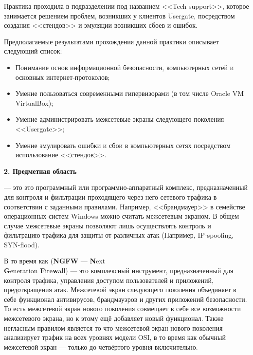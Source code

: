 Практика проходила в подразделении под названием <<Tech support>>, которое занимается решением проблем, возникших у клиентов Usergate, посредством создания <<стендов>> и эмуляции возникших сбоев и ошибок.
		
Предполагаемые результатами прохождения данной практики описывает следующий список:

\begin{itemize}[nosep]
	\item Понимание основ информационной безопасности, компьютерных сетей и основных интернет-протоколов;
				
	\item Умение пользоваться современными гипервизорами (в том числе Oracle VM VirtualBox);
			
	\item Умение администрировать межсетевые экраны следующего поколения\\<<Usergate>>;
			
	\item Умение эмулировать ошибки и сбои в компьютерных сетях посредством использование <<стендов>>.
\end{itemize}

\begin{center}
	\textbf{\Large 2. Предметная область}
\end{center}

 --- это это программный или программно-аппаратный комплекс, предназначенный для контроля и фильтрации проходящего через него сетевого трафика в соответствии с заданными правилами. Например, <<брандмауер>> в семействе операционных систем Windows можно считать межсетевым экраном. В общем случае межсетевые экраны позволяют лишь осуществлять контроль и фильтрацию трафика для защиты от различных атак (Например, IP-spoofing, SYN-flood).
		
В то время как  (\textbf{NGFW} --- \textbf{N}ext \\\textbf{G}eneration \textbf{F}ire\textbf{w}all) --- это комплексный инструмент, предназначенный для контроля трафика, управления доступом пользователей и приложений, предотвращения атак. Межсетевой экран следующего поколения объединяет в себе функционал антивирусов, брандмауэров и других приложений безопасности. То есть межсетевой экран нового поколения совмещает в себе все возможности межсетевого экрана, но к этому ещё добавляет новый функционал. Также негласным правилом является то что межсетевой экран нового поколения анализирует трафик на всех уровнях модели OSI, в то время как обычный межсетевой экран --- только до четвёртого уровня включительно.

